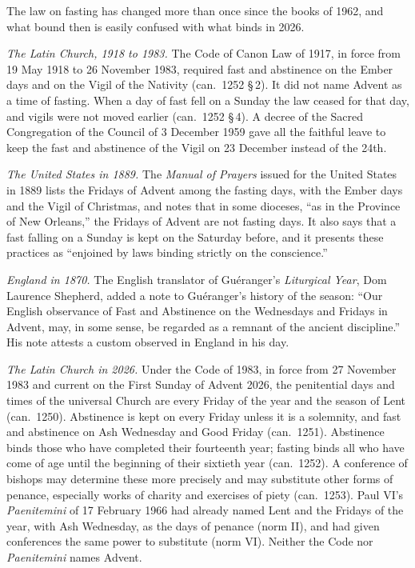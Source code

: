 The law on fasting has changed more than once since the books of 1962, and what bound then is
easily confused with what binds in 2026.

\textit{The Latin Church, 1918 to 1983.} The Code of Canon Law of 1917, in force from 19 May 1918
to 26 November 1983, required fast and abstinence on the Ember days and on the Vigil of the
Nativity (can.~1252 \S\,2). It did not name Advent as a time of fasting. When a day of fast fell on
a Sunday the law ceased for that day, and vigils were not moved earlier (can.~1252 \S\,4). A
decree of the Sacred Congregation of the Council of 3 December 1959 gave all the faithful leave to
keep the fast and abstinence of the Vigil on 23 December instead of the 24th.

\textit{The United States in 1889.} The \textit{Manual of Prayers} issued for the United States in
1889 lists the Fridays of Advent among the fasting days, with the Ember days and the Vigil of
Christmas, and notes that in some dioceses, ``as in the Province of New Orleans,'' the Fridays of
Advent are not fasting days. It also says that a fast falling on a Sunday is kept on the Saturday
before, and it presents these practices as ``enjoined by laws binding strictly on the conscience.''

\textit{England in 1870.} The English translator of Guéranger's \textit{Liturgical Year}, Dom
Laurence Shepherd, added a note to Guéranger's history of the season: ``Our English observance of
Fast and Abstinence on the Wednesdays and Fridays in Advent, may, in some sense, be regarded as a
remnant of the ancient discipline.'' His note attests a custom observed in England in his day.

\textit{The Latin Church in 2026.} Under the Code of 1983, in force from 27 November 1983 and current
on the First Sunday of Advent 2026, the penitential days and times of the universal Church are
every Friday of the year and the season of Lent (can.~1250). Abstinence is kept on every Friday
unless it is a solemnity, and fast and abstinence on Ash Wednesday and Good Friday (can.~1251).
Abstinence binds those who have completed their fourteenth year; fasting binds all who have come
of age until the beginning of their sixtieth year (can.~1252). A conference of bishops may determine these more
precisely and may substitute other forms of penance, especially works of charity and exercises of
piety (can.~1253). Paul VI's \textit{Paenitemini} of 17 February 1966 had already named Lent and
the Fridays of the year, with Ash Wednesday, as the days of penance (norm II), and had given
conferences the same power to substitute (norm VI). Neither the Code nor \textit{Paenitemini}
names Advent.

